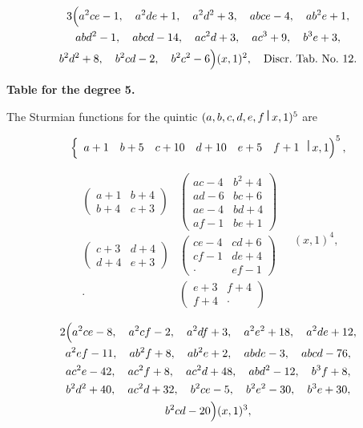 \documentclass[12pt,a4paper]{article}
\theoremstyle{definition}
\begin{document}
\begin{multline*}
3\Bigl(
a^2ce -1,\quad a^2de+1,\quad a^2d^2+3,\quad abce-4,\quad ab^2e+1,\\
abd^2-1,\quad abcd-14,\quad ac^2d+3,\quad ac^3+9,\quad b^3e+3,\\
b^2d^2+8,\quad b^2cd-2,\quad b^2c^2-6
\Bigr)(x,1)^2,\quad \text{Discr.~Tab.~No.~12.}
\end{multline*}

\bigskip
\noindent\textbf{Table for the degree 5.}

The Sturmian functions for the quintic $(a,b,c,d,e,f\,\raisebox{0.5ex}{\textbf{\textbar}}\,x,1)^5$ are

\[
\left\{
\begin{array}{cccccc}
a+1 & b+5 & c+10 & d+10 & e+5 & f+1
\end{array}
\,\raisebox{0.5ex}{\textbf{\textbar}}\,x,1\right)^5,
\]

\[
\begin{array}{cc}
\begin{pmatrix}
a+1 & b+4 \\
b+4 & c+3
\end{pmatrix} &
\begin{pmatrix}
ac-4 & b^2+4 \\
ad-6 & bc+6 \\
ae-4 & bd+4 \\
af-1 & be+1
\end{pmatrix} \\
\begin{pmatrix}
c+3 & d+4 \\
d+4 & e+3
\end{pmatrix} &
\begin{pmatrix}
ce-4 & cd+6 \\
cf-1 & de+4 \\
\cdot & ef-1
\end{pmatrix} \\
\cdot & \begin{pmatrix} e+3 & f+4 \\ f+4 & \cdot \end{pmatrix}
\end{array}
\quad
(x,1)^4,
\]

\begin{multline*}
2\Bigl(
a^2ce - 8,\quad a^2cf - 2,\quad a^2df + 3,\quad a^2e^2 + 18,\quad a^2de + 12,\\
a^2ef - 11,\quad ab^2f + 8,\quad ab^2e + 2,\quad abde - 3,\quad abcd - 76,\\
ac^2e - 42,\quad ac^2f + 8,\quad ac^2d + 48,\quad abd^2 - 12,\quad b^3f + 8,\\
b^2d^2 + 40,\quad ac^2d + 32,\quad b^2ce - 5,\quad b^2e^2 - 30,\quad b^3e + 30,\\
b^2cd - 20
\Bigr)(x,1)^3,
\end{multline*}
\end{document}
